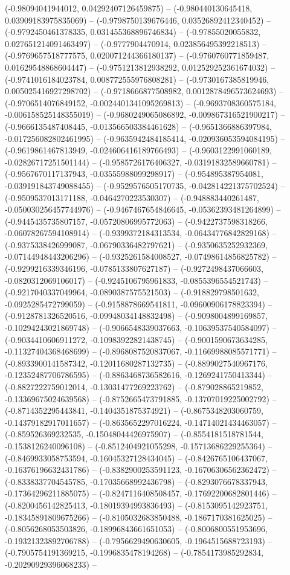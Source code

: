 (-0.98094041944012, 0.04292407126459875) -- (-0.980440130645418, 0.03909183975835069) -- (-0.9798750139676446, 0.03526892412340452) -- (-0.9792450461378335, 0.031455368896746834) -- (-0.97855020055832, 0.027651214091463497) -- (-0.9777904470914, 0.023856495392218513) -- (-0.9769657518777575, 0.020071244366180137) -- (-0.9760760771859487, 0.01629548868604447) -- (-0.9751213812938292, 0.012529252361674032) -- (-0.9741016184023784, 0.008772555976808281) -- (-0.9730167385819946, 0.005025416927298702) -- (-0.9718666877508982, 0.0012878496573624693) -- (-0.9706514076849152, -0.0024401341095269813) -- (-0.9693708360575184, -0.006158525148355019) -- (-0.9680249065086892, -0.009867316521900217) -- (-0.9666135487408445, -0.013566503384461628) -- (-0.9651366886397984, -0.017256082802461995) -- (-0.9635942484185414, -0.020936053594084195) -- (-0.9619861467813949, -0.024606416189766493) -- (-0.9603122991060189, -0.02826717251501144) -- (-0.9585726176406327, -0.03191832589660781) -- (-0.9567670117137943, -0.03555988099298917) -- (-0.954895387954081, -0.039191843749088455) -- (-0.9529576505170735, -0.042814221375702524) -- (-0.9509537013171188, -0.0464270223530307) -- (-0.948883440261487, -0.050030256457744976) -- (-0.9467467654846645, -0.05362393481264899) -- (-0.9445435735807157, -0.05720806995772063) -- (-0.9422737598318266, -0.06078267594108914) -- (-0.9399372184313534, -0.06434776842829168) -- (-0.9375338426999087, -0.06790336482797621) -- (-0.9350635252932369, -0.07144948443206296) -- (-0.9325261584008527, -0.07498614856825782) -- (-0.9299216339346196, -0.0785133807627187) -- (-0.9272498437066603, -0.0820312069106017) -- (-0.9245106795961833, -0.0855396554521743) -- (-0.9217040337049964, -0.0890387575521503) -- (-0.918829798501632, -0.0925285472799059) -- (-0.9158878669541811, -0.09600906178823394) -- (-0.9128781326520516, -0.09948034148832498) -- (-0.9098004899169857, -0.10294243021869748) -- (-0.9066548339037663, -0.10639537540584097) -- (-0.9034410606911272, -0.10983922821438745) -- (-0.9001590673634285, -0.11327404368468699) -- (-0.8968087520837067, -0.11669988085571771) -- (-0.8933900141587342, -0.12011680287132735) -- (-0.8899027540967176, -0.12352487706786595) -- (-0.8863468736582616, -0.1269241750413344) -- (-0.8827222759012014, -0.13031477269223762) -- (-0.879028865219852, -0.13369675024639568) -- (-0.8752665473791885, -0.13707019225002792) -- (-0.8714352295443841, -0.1404351875374921) -- (-0.8675348203060759, -0.14379182917011657) -- (-0.8635652297016224, -0.14714021434463057) -- (-0.859526369232535, -0.15048044426975907) -- (-0.8554181518781544, -0.1538126240096108) -- (-0.8512404921055298, -0.15713686229255364) -- (-0.8469933058753594, -0.16045327128434045) -- (-0.8426765106437067, -0.16376196632431786) -- (-0.8382900253591123, -0.16706306562362472) -- (-0.8338337704545785, -0.17035668992436798) -- (-0.8293076678337943, -0.17364296211885075) -- (-0.8247116408508457, -0.17692200682801446) -- (-0.8200456142825413, -0.18019394993836493) -- (-0.8153095142923751, -0.18345891809675266) -- (-0.8105032683850488, -0.1867170381625025) -- (-0.8056268053503826, -0.18996843661651053) -- (-0.8006800551953696, -0.19321323892706788) -- (-0.7956629490630605, -0.1964515688723193) -- (-0.7905754191369215, -0.1996835478194268) -- (-0.7854173985292834, -0.20290929396068233) -- 